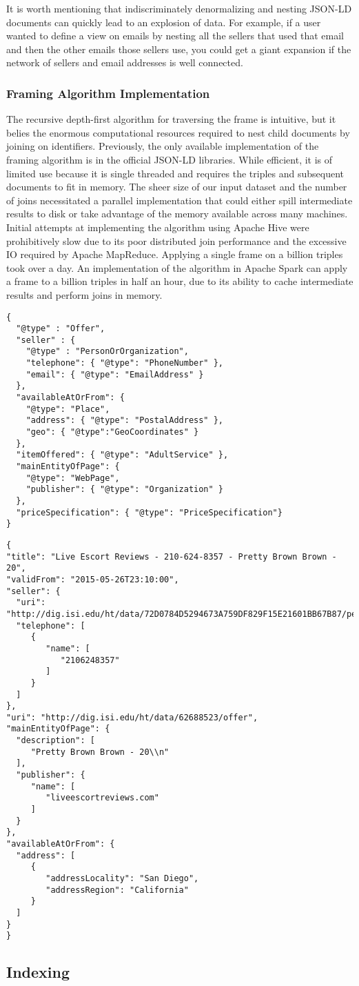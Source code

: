 It is worth mentioning that indiscriminately denormalizing and nesting JSON-LD documents can quickly lead to an explosion of data.  For example, if a user wanted to define a view on emails by nesting all the sellers that used that email and then the other emails those sellers use, you could get a giant expansion if the network of sellers and email addresses is well connected.    

\subsubsection{Framing Algorithm Implementation}
The recursive depth-first algorithm for traversing the frame is intuitive, but it belies the enormous computational resources required to nest child documents by joining on identifiers.
Previously, the only available implementation of the framing algorithm is in the official JSON-LD libraries.  %
While efficient, it is of limited use because it  is single threaded and requires the triples and subsequent documents to fit in memory.
The sheer size of our input dataset and the number of joins necessitated a parallel implementation that could either spill intermediate results to disk or take advantage of the memory available across many machines. 
Initial attempts at implementing the algorithm using Apache Hive were prohibitively slow due to its poor distributed join performance and the excessive IO required by Apache MapReduce.  Applying a single frame on a billion triples took over a day.  
An implementation of the algorithm in Apache Spark can apply a frame to a billion triples in half an hour, due to its ability to cache intermediate results and perform joins in memory.   

\begin{verbatim}
{ 
  "@type" : "Offer",
  "seller" : {
    "@type" : "PersonOrOrganization",
    "telephone": { "@type": "PhoneNumber" },
    "email": { "@type": "EmailAddress" }
  },
  "availableAtOrFrom": {
    "@type": "Place",
    "address": { "@type": "PostalAddress" },
    "geo": { "@type":"GeoCoordinates" }
  },
  "itemOffered": { "@type": "AdultService" },
  "mainEntityOfPage": {
    "@type": "WebPage",
    "publisher": { "@type": "Organization" }
  },
  "priceSpecification": { "@type": "PriceSpecification"}
}

\end{verbatim}

\begin{verbatim}
{
"title": "Live Escort Reviews - 210-624-8357 - Pretty Brown Brown - 20",
"validFrom": "2015-05-26T23:10:00",
"seller": {
  "uri": "http://dig.isi.edu/ht/data/72D0784D5294673A759DF829F15E21601BB67B87/personororganization",
  "telephone": [
     {
        "name": [
           "2106248357"
        ]
     }
  ]
},
"uri": "http://dig.isi.edu/ht/data/62688523/offer",
"mainEntityOfPage": {
  "description": [
     "Pretty Brown Brown - 20\\n"
  ],
  "publisher": {
     "name": [
        "liveescortreviews.com"
     ]
  }
},
"availableAtOrFrom": {
  "address": [
     {
        "addressLocality": "San Diego",
        "addressRegion": "California"
     }
  ]
}
}
\end{verbatim}

\subsection{Indexing}
